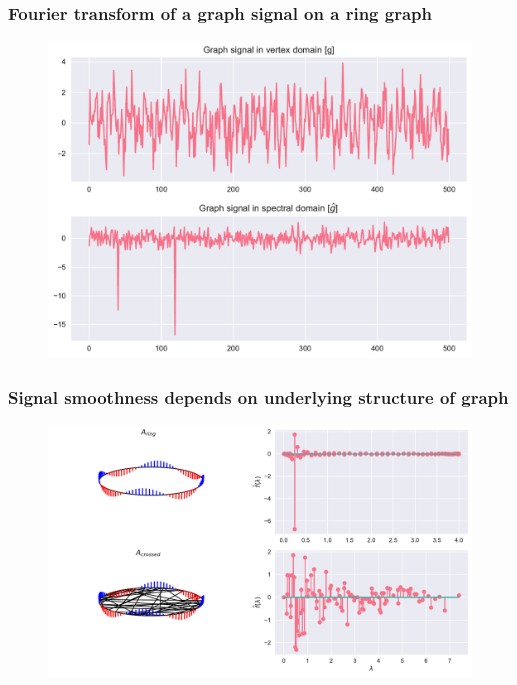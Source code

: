 \documentclass{beamer}
\begin{document}
\begin{frame}
  \frametitle{Fourier transform of a graph signal on a ring graph}
\begin{figure}
\includegraphics[width=0.7\linewidth]{../img/graph_fourier_transform_2.pdf}
\end{figure}
\end{frame}

\begin{frame}
  \frametitle{Signal smoothness depends on underlying structure of graph}
\begin{figure}
\includegraphics[width=0.9\linewidth]{../img/signal_smoothness_0.pdf}
\end{figure}
\end{frame}
\end{document}
